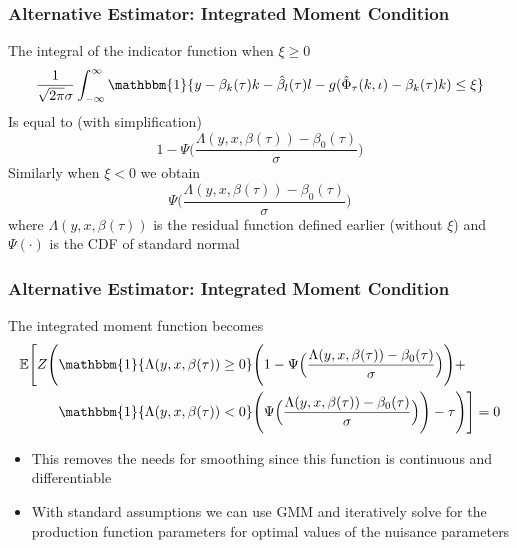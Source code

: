\documentclass{beamer}
\begin{document}
\begin{frame}
\frametitle{Alternative Estimator: Integrated Moment Condition}
The integral of the indicator function when $\xi\geq 0$
\begin{equation}
	\frac{1}{\sqrt{2\pi}\sigma}\int_{-\infty}^{\infty}\mathbbm{1}\{y-\beta_{k}(\tau)k-\hat{\beta}_{l}(\tau)l-g(\hat{\Phi}_{\tau}(k, \iota)-\beta_{k}(\tau)k)\leq \xi\}
\end{equation}
Is equal to (with simplification)
\begin{equation}
	1-\Psi\Big(\frac{\Lambda(y, x, \beta(\tau))-\beta_{0}(\tau)}{\sigma}\Big)
\end{equation}
Similarly when $\xi<0$ we obtain
\begin{equation}
	\Psi\Big(\frac{\Lambda(y, x, \beta(\tau))-\beta_{0}(\tau)}{\sigma}\Big)
\end{equation}
where $\Lambda(y, x, \beta(\tau))$ is the residual function defined earlier (without $\xi$) and $\Psi(\cdot)$ is the CDF of standard normal
\end{frame}


\begin{frame}
\frametitle{Alternative Estimator: Integrated Moment Condition}
The integrated moment function becomes
\begin{equation}
\begin{split}
	\mathbb{E}\Bigg[Z\Bigg(&\mathbbm{1}\{\Lambda(y, x, \beta(\tau))\geq0\}\Bigg(1-\Psi\Big(\frac{\Lambda(y, x, \beta(\tau))-\beta_{0}(\tau)}{\sigma}\Big)\Bigg)+
	\\&\mathbbm{1}\{\Lambda(y, x, \beta(\tau))<0\}\Bigg(\Psi\Big(\frac{\Lambda(y, x, \beta(\tau))-\beta_{0}(\tau)}{\sigma}\Big)\Bigg)-\tau\Bigg)\Bigg]=0
	\end{split}
\end{equation}
\begin{itemize}
	\item This removes the needs for smoothing since this function is continuous and differentiable
	\item With standard assumptions we can use GMM and iteratively solve for the production function parameters for optimal values of the nuisance parameters
\end{itemize}
\end{frame}
\end{document}
